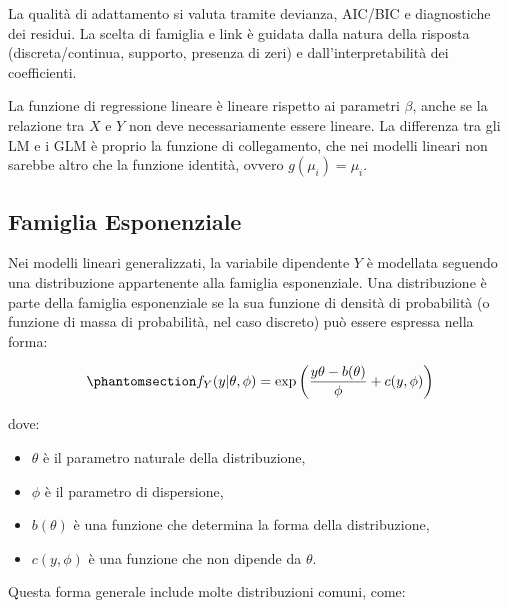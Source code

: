 \documentclass[
  italian,
  a4paper,
  a4paper,
  twoside,
  open=right,
  12pt]{scrbook}
\theoremstyle{definition}
\theoremstyle{remark}
\begin{document}
La qualità di adattamento si valuta tramite devianza, AIC/BIC e
diagnostiche dei residui. La scelta di famiglia e link è guidata dalla
natura della risposta (discreta/continua, supporto, presenza di zeri) e
dall'interpretabilità dei coefficienti.

La funzione di regressione lineare è lineare rispetto ai parametri
\(\beta\), anche se la relazione tra \(X\) e \(Y\) non deve
necessariamente essere lineare. La differenza tra gli LM e i GLM è
proprio la funzione di collegamento, che nei modelli lineari non sarebbe
altro che la funzione identità, ovvero \(g(\mu_i) = \mu_i\).

\subsection{Famiglia Esponenziale}\label{sec-esponenziale}

Nei modelli lineari generalizzati, la variabile dipendente \(Y\) è
modellata seguendo una distribuzione appartenente alla famiglia
esponenziale. Una distribuzione è parte della famiglia esponenziale se
la sua funzione di densità di probabilità (o funzione di massa di
probabilità, nel caso discreto) può essere espressa nella forma:

\begin{equation}\phantomsection\label{eq-exp_family}{
f_Y(y|\theta, \phi) = \exp\left(\frac{y \theta - b(\theta)}{\phi} + c(y, \phi)\right)
}\end{equation}

dove:

\begin{itemize}
\item
  \(\theta\) è il parametro naturale della distribuzione,
\item
  \(\phi\) è il parametro di dispersione,
\item
  \(b(\theta)\) è una funzione che determina la forma della
  distribuzione,
\item
  \(c(y, \phi)\) è una funzione che non dipende da \(\theta\).
\end{itemize}

Questa forma generale include molte distribuzioni comuni, come:
\end{document}

